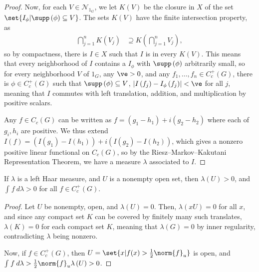 \documentclass[10pt]{mypackage}
\begin{document}
\begin{proof}
  Now, for each $V\in \mathcal{N}_{1_G}$, we let $K(V)$ be the closure in $X$ of the set $\set{I_{\phi} | \supp\left( \phi \right)\subseteq V}$. The sets $K(V)$ have the finite intersection property, as
  \begin{align*}
    \bigcap_{j=1}^{n} K\left( V_j \right) &\supseteq K\left( \bigcap_{j=1}^{n}V_j \right),
  \end{align*}
  so by compactness, there is $I\in X$ such that $I$ is in every $K(V)$. This means that every neighborhood of $I$ contains a $I_{\phi}$ with $\supp\left( \phi \right)$ arbitrarily small, so for every neighborhood $V$ of $1_G$, any $\ve > 0$, and any $f_1,\dots,f_n\in C_c^{+}\left( G \right)$, there is $\phi\in C_c^{+}\left( G \right)$ such that $\supp\left( \phi \right)\subseteq V$, $\left\vert I\left( f_j \right) - I_{\phi}\left( f_j \right) \right\vert < \ve$ for all $j$, meaning that $I$ commutes with left translation, addition, and multiplication by positive scalars.\newline

  Any $f\in C_c(G)$ can be written as $f = \left( g_1-h_1 \right) + i\left( g_2-h_2 \right)$ where each of $g_i,h_i$ are positive. We thus extend $I(f) = \left( I\left( g_1 \right) - I\left( h_1 \right) \right) + i\left( I\left( g_2 \right)-I\left( h_2 \right) \right)$, which gives a nonzero positive linear functional on $C_c\left( G \right)$, so by the Riesz--Markov--Kakutani Representation Theorem, we have a measure $\lambda$ associated to $I$.
\end{proof}
\begin{proposition}
  If $\lambda$ is a left Haar measure, and $U$ is a nonempty open set, then $\lambda\left( U \right) > 0$, and $ \int_{}^{} f\:d\lambda > 0 $ for all $f\in C_c^{+}\left( G \right)$.
\end{proposition}
\begin{proof}
  Let $U$ be nonempty, open, and $\lambda\left( U \right) = 0$. Then, $\lambda\left( xU \right) = 0$ for all $x$, and since any compact set $K$ can be covered by finitely many such translates, $\lambda\left( K \right) = 0$ for each compact set $K$, meaning that $\lambda\left( G \right) = 0$ by inner regularity, contradicting $\lambda$ being nonzero.\newline

  Now, if $f\in C_c^{+}\left( G \right)$, then $U = \set{x | f(x) > \frac{1}{2}\norm{f}_{u}}$ is open, and $\int_{}^{} f\:d\lambda > \frac{1}{2}\norm{f}_{u}\lambda\left( U \right) > 0$.
\end{proof}
\end{document}
